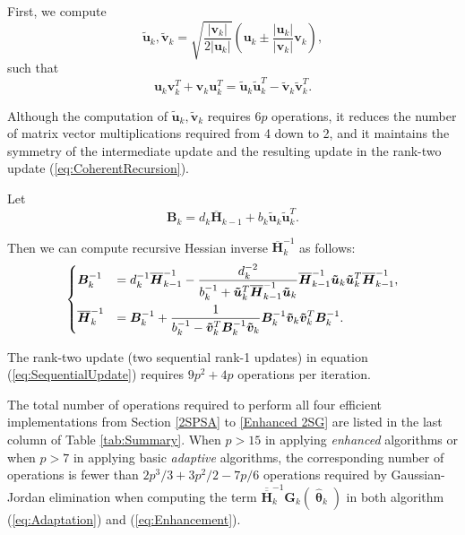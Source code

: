 \documentclass[conference]{IEEEtran}
\newcommand{\bG}{\bm{G}}
\newcommand{\oH}{\bm{\overline{H}}}
\newcommand{\ooH}{\bm{\overline{\overline{H}}}}
\newcommand{\htheta}{\bm{\hat{\uptheta}}}
\begin{document}
	First, we compute
	\begin{equation}
		\bm{\tilde{u}}_k, \bm{\tilde{v}}_k =
		\sqrt{\frac{|\bm{v}_k|}{2|\bm{u}_k|}} (\bm{u}_k \pm
		\frac{|\bm{u}_k|}{|\bm{v}_k|}\bm{v}_k),
	\end{equation}
	such that
	\begin{equation*}
		\bm{u}_k \bm{v}_k^{T}+\bm{v}_k \bm{u}_k^{T} = \bm{\tilde{u}}_k
		\bm{\tilde{u}}_k^{T} - \bm{\tilde{v}}_k \bm{\tilde{v}}_k^{T}.
	\end{equation*}
	
	Although the computation of $\bm{\tilde{u}}_k, \bm{\tilde{v}}_k$ requires
	$6p$ operations, it reduces the number of matrix vector multiplications
	required from 4 down to 2, and it maintains the symmetry of the intermediate update and the resulting update in the rank-two update (\ref{eq:CoherentRecursion}).
		
	Let
	\begin{equation*}
		\bm{B}_k=d_k\oH_{k-1}+b_k\bm{\tilde{u}}_k \bm{\tilde{u}}_k^{T}.
	\end{equation*}
	
	Then we can compute recursive Hessian inverse $\oH_k^{-1}$ as follows:
	\begin{equation} \label{eq:SequentialUpdate}
		\begin{dcases}
			\bm{B}_k^{-1}
			&= d_k^{-1}\oH_{k-1}^{-1} -
			\frac{d_k^{-2}}{b_k^{-1}+\bm{\tilde{u}}_k^{T}\oH_{k-1}^{-1}\bm{\tilde{u}}_k}
			\oH_{k-1}^{-1}\bm{\tilde{u}}_k \bm{\tilde{u}}_k^{T}\oH_{k-1}^{-1},\\
			\oH_k^{-1}
			&=\bm{B}_k^{-1} + \frac{1}{b_k^{-1}-\bm{\tilde{v}}_k^{T}\bm{B}_k^{-1}\bm{\tilde{v}}_k} \bm{B}_k^{-1}\bm{\tilde{v}}_k \bm{\tilde{v}}_k^{T}\bm{B}_{k}^{-1}.
		\end{dcases}
	\end{equation}
	
	The rank-two update (two sequential rank-1 updates) in equation (\ref{eq:SequentialUpdate}) requires $9p^2 + 4p$ operations per iteration. 
	
	 The total number of operations required to perform all four efficient implementations from Section \ref{2SPSA} to \ref{Enhanced 2SG} are listed in the last column of Table \ref{tab:Summary}. When $p>15$ in applying \textit{enhanced} algorithms or when $p>7$ in applying basic \textit{adaptive} algorithms, the corresponding number of operations is fewer than $2p^3/3+3p^2/2-7p/6$ operations required by Gaussian-Jordan elimination when computing the term $\ooH_k^{-1} \bG_k(\htheta_k)$ in both algorithm (\ref{eq:Adaptation}) and (\ref{eq:Enhancement}).
	
\end{document}
